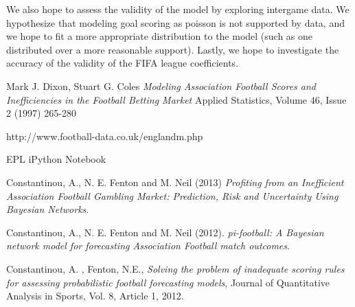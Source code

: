 \documentclass[12pt]{article}
\begin{document}
\par
We also hope to assess the validity of the model by exploring intergame data. We 
hypothesize that modeling goal scoring as poisson is not supported by data, and 
we hope to fit a more appropriate distribution to the model (such as one distributed 
over a more reasonable support). Lastly, we hope to investigate the accuracy of the validity
of the FIFA league coefficients.



\begin{thebibliography}{1}

	 Mark J. Dixon, Stuart G. Coles {\em Modeling Association
	Football Scores and Inefficiencies in the Football Betting Market} Applied Statistics,
	Volume 46, Issue 2 (1997) 265-280
	
	 http://www.football-data.co.uk/englandm.php
	
	 EPL iPython Notebook
	
	 Constantinou, A., N. E. Fenton and M. Neil (2013) {\em Profiting
	from an Inefficient Association Football Gambling Market: Prediction, Risk and 
	Uncertainty Using Bayesian Networks}.
	
	 Constantinou, A., N. E. Fenton and M. Neil (2012). {\em pi-football:
	A Bayesian network model for forecasting Association Football match outcomes}.
	
	 Constantinou, A. , Fenton, N.E., {\em Solving the problem of inadequate
	scoring rules for assessing probabilistic football forecasting models}, Journal of Quantitative 
	Analysis in Sports, Vol. 8, Article 1, 2012.
	
\end{thebibliography}
\end{document}
